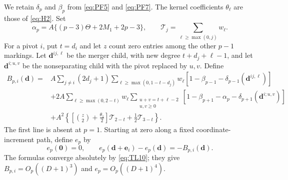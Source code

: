 We retain $\delta_p$ and $\beta_p$ from \eqref{eq:PF5} and
\eqref{eq:PF7}. The kernel coefficients $\theta_\ell$ are those of \eqref{eq:H2}. Set
\begin{equation}
 \alpha_p=A\{(p-3)\Theta+2M_1+2p-3\},\qquad
 \mathcal T_j=\sum_{\ell\ge\max(0,j)}w_\ell.
 \label{eq:ST1}
\end{equation}
For a pivot $i$, put $t=d_i$ and let $z$ count zero entries among the
other $p-1$ markings. Let $\mathbf d^{ij,\ell}$ be the merger child,
with new degree $t+d_j+\ell-1$, and let $\mathbf d^{i;u,v}$ be the
nonseparating child with the pivot replaced by $u,v$. Define
\begin{equation}
\begin{split}
 B_{p,i}(\mathbf d)={}&
 A\sum_{j\ne i}(2d_j+1)
 \sum_{\ell\ge\max(0,1-t-d_j)}w_\ell
 [1-\beta_{p-1}-\delta_{p-1}(\mathbf d^{ij,\ell})]\\
 &+2A\sum_{\ell\ge\max(0,2-t)}w_\ell
 \sum_{\substack{u+v=t+\ell-2\\u,v\ge0}}
 [1-\beta_{p+1}-\alpha_p-\delta_{p+1}(\mathbf d^{i;u,v})]\\
 &+A^2\left\{\left[\binom z2+\frac{\theta_1}2\right]
                    \mathcal T_{2-t}+\frac12\mathcal T_{3-t}\right\}.
\end{split}
 \label{eq:ST2}
\end{equation}
The first line is absent at $p=1$. Starting at zero along a fixed
coordinate-increment path, define $e_p$ by
\begin{equation}
 e_p(\mathbf0)=0,\qquad
 e_p(\mathbf d+\mathbf e_i)-e_p(\mathbf d)=-B_{p,i}(\mathbf d).
 \label{eq:ST3}
\end{equation}
The formulas converge absolutely by \eqref{eq:TL10}; they give
$B_{p,i}=O_p((D+1)^3)$ and $e_p=O_p((D+1)^4)$.

